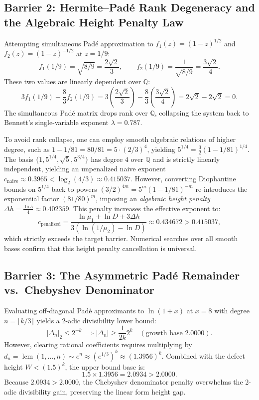 \documentclass[11pt,reqno]{amsart}
\theoremstyle{definition}
\numberwithin{equation}{section}
\begin{document}
\subsection{\texorpdfstring{Barrier 2: Hermite--Padé Rank Degeneracy and the Algebraic Height Penalty Law}{Barrier 2: Hermite--Pade Rank Degeneracy and the Algebraic Height Penalty Law}}
Attempting simultaneous Padé approximation to $f_1(z) = (1 - z)^{1/2}$ and $f_2(z) = (1 - z)^{-1/2}$ at $z = 1/9$:
\[
f_1(1/9) = \sqrt{8/9} = \frac{2\sqrt{2}}{3}, \qquad f_2(1/9) = \frac{1}{\sqrt{8/9}} = \frac{3\sqrt{2}}{4}.
\]
These two values are linearly dependent over $\mathbb{Q}$:
\[
3 f_1(1/9) - \frac{8}{3} f_2(1/9) = 3 \left(\frac{2\sqrt{2}}{3}\right) - \frac{8}{3}\left(\frac{3\sqrt{2}}{4}\right) = 2\sqrt{2} - 2\sqrt{2} = 0.
\]
The simultaneous Padé matrix drops rank over $\mathbb{Q}$, collapsing the system back to Bennett's single-variable exponent $\lambda = 0.787$.

To avoid rank collapse, one can employ smooth algebraic relations of higher degree, such as $1 - 1/81 = 80/81 = 5 \cdot (2/3)^4$, yielding $5^{1/4} = \frac{3}{2}(1 - 1/81)^{1/4}$. The basis $\{1, 5^{1/4}, \sqrt{5}, 5^{3/4}\}$ has degree $4$ over $\mathbb{Q}$ and is strictly linearly independent, yielding an unpenalized naive exponent $c_{\mathrm{naive}} \approx 0.3965 < \log_2(4/3) \approx 0.415037$. However, converting Diophantine bounds on $5^{1/4}$ back to powers $(3/2)^{4m} = 5^m (1 - 1/81)^{-m}$ re-introduces the exponential factor $(81/80)^m$, imposing an \emph{algebraic height penalty} $\Delta h = \frac{\ln 5}{4} \approx 0.402359$. This penalty increases the effective exponent to:
\begin{equation}
c_{\mathrm{penalized}} = \frac{\ln \mu_1 + \ln D + 3 \Delta h}{3(\ln(1/\mu_2) - \ln D)} \approx \mathbf{0.434672} > \mathbf{0.415037},
\end{equation}
which strictly exceeds the target barrier. Numerical searches over all smooth bases confirm that this height penalty cancellation is universal.

\subsection{Barrier 3: The Asymmetric Padé Remainder vs.\ Chebyshev Denominator}
Evaluating off-diagonal Padé approximants to $\ln(1+x)$ at $x = 8$ with degree $n = \lfloor k/3 \rfloor$ yields a $2$-adic divisibility lower bound:
\[
|\Delta_n|_2 \le 2^{-k} \implies |\Delta_n| \ge \frac{1}{2k} 2^k \quad (\text{growth base } 2.0000).
\]
However, clearing rational coefficients requires multiplying by $d_n = \operatorname{lcm}(1, \dots, n) \sim e^n \approx (e^{1/3})^k \approx (1.3956)^k$.
Combined with the defect height $W < (1.5)^k$, the upper bound base is:
\begin{equation}
1.5 \times 1.3956 = \mathbf{2.0934} > \mathbf{2.0000}.
\end{equation}
Because $2.0934 > 2.0000$, the Chebyshev denominator penalty overwhelms the 2-adic divisibility gain, preserving the linear form height gap.
\end{document}
